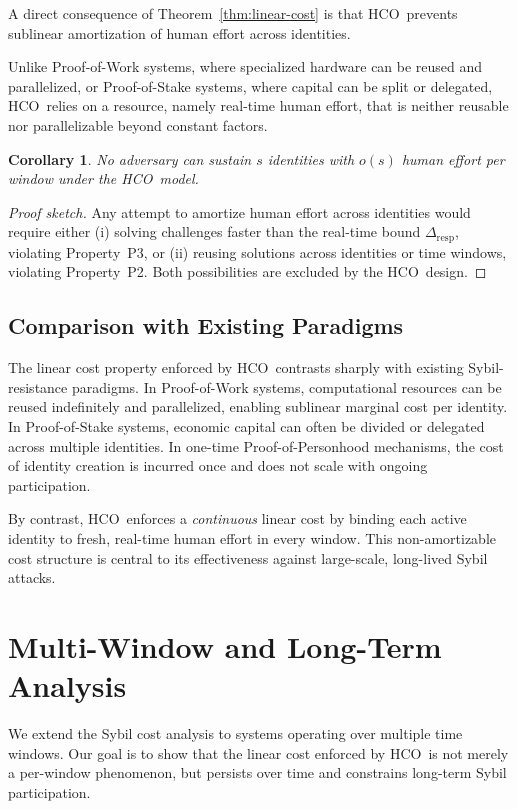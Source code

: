\documentclass[11pt]{article}
\newcommand{\HCO}{HCO\xspace}
\newtheorem{corollary}{Corollary}
\begin{document}
A direct consequence of Theorem~\ref{thm:linear-cost} is that \HCO\ prevents sublinear amortization of human effort across identities.

Unlike Proof-of-Work systems, where specialized hardware can be reused and parallelized, or Proof-of-Stake systems, where capital can be split or delegated, \HCO\ relies on a resource, namely real-time human effort, that is neither reusable nor parallelizable beyond constant factors.

\begin{corollary}
	No adversary can sustain $s$ identities with $o(s)$ human effort per window under the \HCO\ model.
\end{corollary}

\begin{proof}[Proof sketch]
	Any attempt to amortize human effort across identities would require either (i) solving challenges faster than the real-time bound $\Delta_{\mathrm{resp}}$, violating Property~P3, or (ii) reusing solutions across identities or time windows, violating Property~P2. Both possibilities are excluded by the \HCO\ design.
\end{proof}

\subsection{Comparison with Existing Paradigms}

The linear cost property enforced by \HCO\ contrasts sharply with existing Sybil-resistance paradigms. In Proof-of-Work systems, computational resources can be reused indefinitely and parallelized, enabling sublinear marginal cost per identity. In Proof-of-Stake systems, economic capital can often be divided or delegated across multiple identities. In one-time Proof-of-Personhood mechanisms, the cost of identity creation is incurred once and does not scale with ongoing participation.

By contrast, \HCO\ enforces a \emph{continuous} linear cost by binding each active identity to fresh, real-time human effort in every window. This non-amortizable cost structure is central to its effectiveness against large-scale, long-lived Sybil attacks.

	
\section{Multi-Window and Long-Term Analysis}

We extend the Sybil cost analysis to systems operating over multiple time windows. Our goal is to show that the linear cost enforced by \HCO\ is not merely a per-window phenomenon, but persists over time and constrains long-term Sybil participation.
\end{document}
